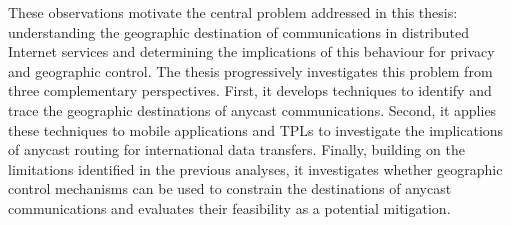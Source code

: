 These observations motivate the central problem addressed in this thesis: understanding the geographic destination of communications in distributed Internet services and determining the implications of this behaviour for privacy and geographic control. The thesis progressively investigates this problem from three complementary perspectives. First, it develops techniques to identify and trace the geographic destinations of anycast communications. Second, it applies these techniques to mobile applications and TPLs to investigate the implications of anycast routing for international data transfers. Finally, building on the limitations identified in the previous analyses, it investigates whether geographic control mechanisms can be used to constrain the destinations of anycast communications and evaluates their feasibility as a potential mitigation.
